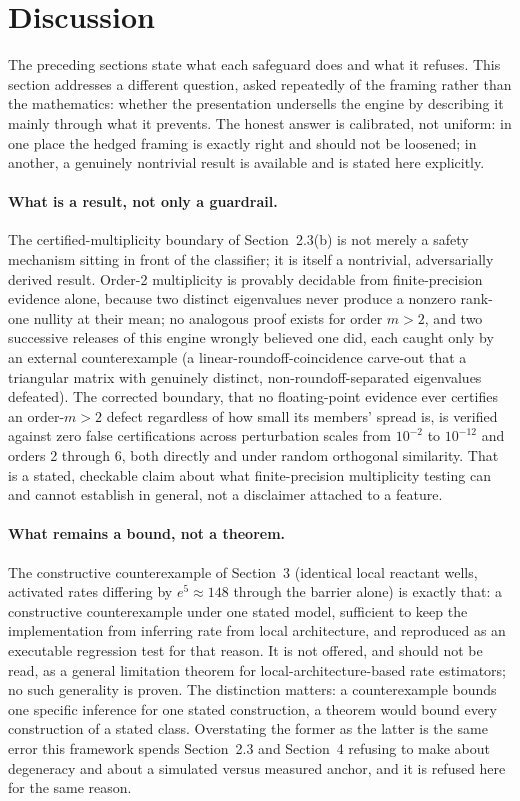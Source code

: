 \section{Discussion}

The preceding sections state what each safeguard does and what it refuses. This
section addresses a different question, asked repeatedly of the framing rather
than the mathematics: whether the presentation undersells the engine by
describing it mainly through what it prevents. The honest answer is
calibrated, not uniform: in one place the hedged framing is exactly right and
should not be loosened; in another, a genuinely nontrivial result is available
and is stated here explicitly.

\paragraph{What is a result, not only a guardrail.} The certified-multiplicity
boundary of Section~2.3(b) is not merely a safety mechanism sitting in front
of the classifier; it is itself a nontrivial, adversarially derived result.
Order-2 multiplicity is provably decidable from finite-precision evidence
alone, because two distinct eigenvalues never produce a nonzero rank-one
nullity at their mean; no analogous proof exists for order \(m>2\), and two
successive releases of this engine wrongly believed one did, each caught only
by an external counterexample (a linear-roundoff-coincidence carve-out that a
triangular matrix with genuinely distinct, non-roundoff-separated eigenvalues
defeated). The corrected boundary, that no floating-point evidence ever
certifies an order-\(m>2\) defect regardless of how small its members' spread
is, is verified against zero false certifications across perturbation scales
from \(10^{-2}\) to \(10^{-12}\) and orders 2 through 6, both directly and
under random orthogonal similarity. That is a stated, checkable claim about
what finite-precision multiplicity testing can and cannot establish in
general, not a disclaimer attached to a feature.

\paragraph{What remains a bound, not a theorem.} The constructive
counterexample of Section~3 (identical local reactant wells, activated rates
differing by \(e^{5}\approx148\) through the barrier alone) is exactly that: a
constructive counterexample under one stated model, sufficient to keep the
implementation from inferring rate from local architecture, and reproduced as
an executable regression test for that reason. It is not offered, and should
not be read, as a general limitation theorem for local-architecture-based rate
estimators; no such generality is proven. The distinction matters: a
counterexample bounds one specific inference for one stated construction, a
theorem would bound every construction of a stated class. Overstating the
former as the latter is the same error this framework spends Section~2.3 and
Section~4 refusing to make about degeneracy and about a simulated versus
measured anchor, and it is refused here for the same reason.

